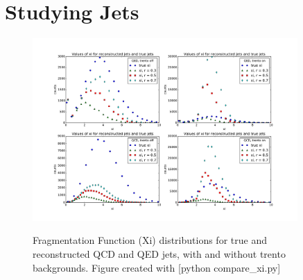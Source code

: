 \documentclass[11pt]{article}
\begin{document}
\section{Studying Jets}
%
%

\begin{figure}[h]
\begin{center}
\includegraphics[width=0.9\textwidth]{compare_xi.pdf}
\label{fig_label}
\caption{Fragmentation Function (Xi) distributions for true and reconstructed QCD and QED jets, with and without trento backgrounds.  Figure created with [python compare\_xi.py]}
\end{center}
\end{figure}

%
%
\end{document}
